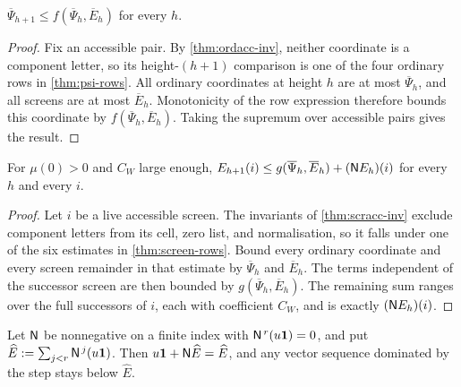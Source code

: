 \begin{lemma}
\label{thm:psi-step}
\leanok
{}
$\overline\Psi_{h+1}\leq f(\overline\Psi_h,\overline E_h)$ for every $h$.
\end{lemma}

\begin{proof}
\leanok
{}
Fix an accessible pair. By \cref{thm:ordacc-inv}, neither coordinate is a component letter, so
its height-$(h+1)$ comparison is one of the four ordinary rows in \cref{thm:psi-rows}. All
ordinary coordinates at height $h$ are at most $\overline\Psi_h$, and all screens are at most
$\overline E_h$. Monotonicity of the row expression therefore bounds this coordinate by
$f(\overline\Psi_h,\overline E_h)$. Taking the supremum over accessible pairs gives the result.
\end{proof}

\begin{lemma}
\label{thm:e-step}
\leanok
{}
For $\mu(0)>0$ and $C_W$ large enough,
$E_{h+1}(i)\leq g(\overline\Psi_h,\overline E_h)+(\mathsf{N} E_h)(i)$ for every $h$ and every $i$.
\end{lemma}

\begin{proof}
\leanok
{}
Let $i$ be a live accessible screen. The invariants of \cref{thm:scracc-inv} exclude component
letters from its cell, zero list, and normalisation, so it falls under one of the six estimates in
\cref{thm:screen-rows}. Bound every ordinary coordinate and every screen remainder in that
estimate by $\overline\Psi_h$ and $\overline E_h$. The terms independent of the successor screen
are then bounded by $g(\overline\Psi_h,\overline E_h)$. The remaining sum ranges over the full
successors of $i$, each with coefficient $C_W$, and is exactly $(\mathsf{N} E_h)(i)$.
\end{proof}

\begin{lemma}
\label{thm:invariant}
\leanok
Let $\mathsf{N}$ be nonnegative on a finite index with $\mathsf{N}^{\,r}(u\mathbf1)=0$, and put
$\widehat E:=\sum_{j<r}\mathsf{N}^{\,j}(u\mathbf1)$. Then $u\mathbf1+\mathsf{N}\widehat E=\widehat E$, and any
vector sequence dominated by the step stays below $\widehat E$.
\end{lemma}

